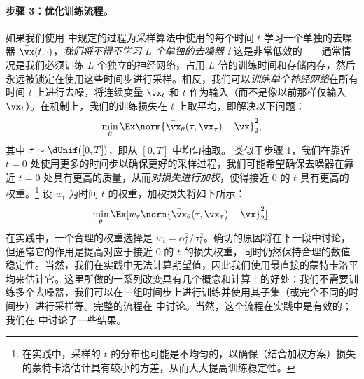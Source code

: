 \documentclass[../../book-main_zh.tex]{subfiles}
\begin{document}
\paragraph{步骤 3：优化训练流程。} 如果我们使用  中规定的过程为采样算法中使用的每个时间 \(t\) 学习一个单独的去噪器 \(\bar{\vx}(t, \cdot)\)，\textit{我们将不得不学习 \(L\) 个单独的去噪器！}这是非常低效的——通常情况是我们必须训练 \(L\) 个独立的神经网络，占用 \(L\) 倍的训练时间和存储内存，然后永远被锁定在使用这些时间步进行采样。相反，我们可以\textit{训练单个神经网络}在所有时间 \(t\) 上进行去噪，将连续变量 \(\vx_{t}\) 和 \(t\) 作为输入（而不是像以前那样仅输入 \(\vx_{t}\)）。在机制上，我们的训练损失在 \(t\) 上取平均，即解决以下问题：
\begin{equation}\label{eq:training loss}
    \min_{\theta}\Ex\norm{\bar{\vx}_{\theta}(\tau,
    \vx_{\tau}) - \vx}_{2}^{2},
\end{equation}
其中 \(\tau \sim \dUnif([0, T])\)，即从 \([0, T]\) 中均匀抽取。
类似于步骤 1，我们在靠近 \(t = 0\) 处使用更多的时间步以确保更好的采样过程，我们可能希望确保去噪器在靠近 \(t = 0\) 处具有更高的质量，从而\textit{对损失进行加权}，使得接近 \(0\) 的 \(t\) 具有更高的权重。\footnote{在实践中，采样的 \(t\) 的分布也可能是不均匀的，以确保（结合加权方案）损失的蒙特卡洛估计具有较小的方差，从而大大提高训练稳定性。}
设 \(w_{t}\) 为时间 \(t\) 的权重，加权损失将如下所示：
\begin{equation}\label{eq:parametric_denoising_loss}
    \min_{\theta}\Ex[w_{\tau}\norm{\bar{\vx}_{\theta}(\tau,
    \vx_{\tau}) - \vx}_{2}^{2}].
\end{equation}
在实践中，一个合理的权重选择是 \(w_{t} =
\alpha_{t}^{2}/\sigma_{t}^{2}\)。确切的原因将在下一段中讨论，但通常它的作用是提高对应于接近 \(0\) 的 \(t\) 的损失权重，同时仍然保持合理的数值稳定性。当然，我们在实践中无法计算期望值，因此我们使用最直接的蒙特卡洛平均来估计它。这里所做的一系列改变具有几个概念和计算上的好处：我们不需要训练多个去噪器，我们可以在一组时间步上进行训练并使用其子集（或完全不同的时间步）进行采样等。完整的流程在  中讨论。当然，这个流程在实践中是有效的；我们在  中讨论了一些结果。
\end{document}
